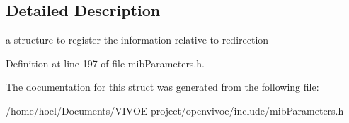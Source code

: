 \subsection{Detailed Description}
a structure to register the information relative to redirection 

Definition at line 197 of file mib\+Parameters.\+h.



The documentation for this struct was generated from the following file\+:\begin{DoxyCompactItemize}
\item 
/home/hoel/\+Documents/\+V\+I\+V\+O\+E-\/project/openvivoe/include/mib\+Parameters.\+h\end{DoxyCompactItemize}
